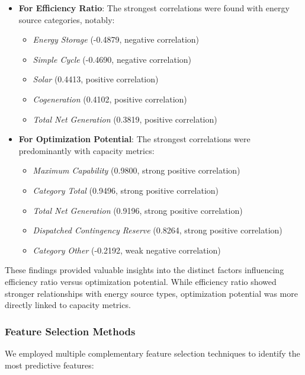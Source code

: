 \documentclass[12pt,a4paper]{article}
\begin{document}
\begin{itemize}
    \item \textbf{For Efficiency Ratio}: The strongest correlations were found with energy source categories, notably:
    \begin{itemize}
        \item \textit{Energy Storage} (-0.4879, negative correlation)
        \item \textit{Simple Cycle} (-0.4690, negative correlation)
        \item \textit{Solar} (0.4413, positive correlation)
        \item \textit{Cogeneration} (0.4102, positive correlation)
        \item \textit{Total Net Generation} (0.3819, positive correlation)
    \end{itemize}
    
    \item \textbf{For Optimization Potential}: The strongest correlations were predominantly with capacity metrics:
    \begin{itemize}
        \item \textit{Maximum Capability} (0.9800, strong positive correlation)
        \item \textit{Category Total} (0.9496, strong positive correlation)
        \item \textit{Total Net Generation} (0.9196, strong positive correlation)
        \item \textit{Dispatched Contingency Reserve} (0.8264, strong positive correlation)
        \item \textit{Category Other} (-0.2192, weak negative correlation)
    \end{itemize}
\end{itemize}

These findings provided valuable insights into the distinct factors influencing efficiency ratio versus optimization potential. While efficiency ratio showed stronger relationships with energy source types, optimization potential was more directly linked to capacity metrics.

\subsubsection{Feature Selection Methods}

We employed multiple complementary feature selection techniques to identify the most predictive features:
\end{document}
